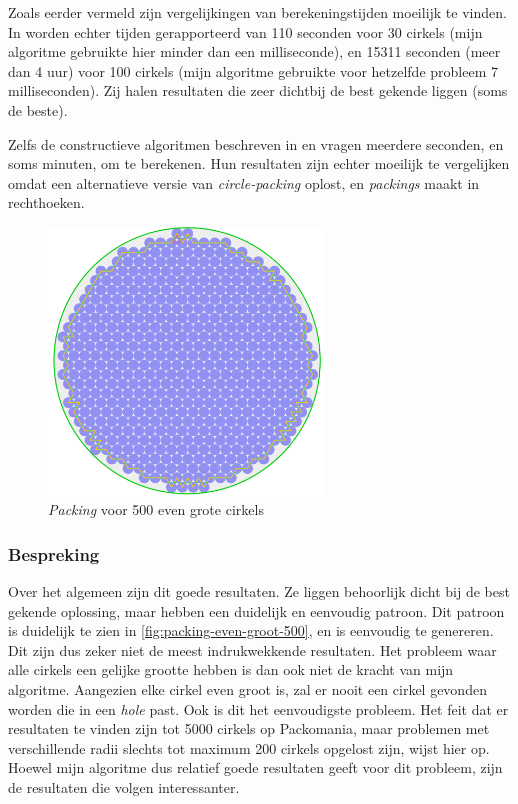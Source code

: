 \documentclass[12pt,a4paper,oneside]{book}
\begin{document}
Zoals eerder vermeld zijn vergelijkingen van berekeningstijden moeilijk te vinden.
In \cite{grosso2010} worden echter tijden gerapporteerd van 110 seconden voor 30 cirkels (mijn algoritme gebruikte hier minder dan een milliseconde), en 15311 seconden (meer dan 4 uur) voor 100 cirkels (mijn algoritme gebruikte voor hetzelfde probleem 7 milliseconden).
Zij halen resultaten die zeer dichtbij de best gekende liggen (soms de beste).

Zelfs de constructieve algoritmen beschreven in \cite{akeb2006basic} en \cite{hifi2004approximate} vragen meerdere seconden, en soms minuten, om te berekenen.
Hun resultaten zijn echter moeilijk te vergelijken omdat \cite{akeb2006basic} een alternatieve versie van \textit{circle-packing} oplost, en \cite{hifi2004approximate} \textit{packings} maakt in rechthoeken.

\begin{figure}
  \centering
  \includegraphics[width=0.65\textwidth]{packing-even-groot-500.png}
  \caption{\textit{Packing} voor 500 even grote cirkels} \label{fig:packing-even-groot-500} 
\end{figure}

\subsubsection{Bespreking}

Over het algemeen zijn dit goede resultaten.
Ze liggen behoorlijk dicht bij de best gekende oplossing, maar hebben een duidelijk en eenvoudig patroon.
Dit patroon is duidelijk te zien in \autoref{fig:packing-even-groot-500}, en is eenvoudig te genereren.
Dit zijn dus zeker niet de meest indrukwekkende resultaten.
Het probleem waar alle cirkels een gelijke grootte hebben is dan ook niet de kracht van mijn algoritme.
Aangezien elke cirkel even groot is, zal er nooit een cirkel gevonden worden die in een \textit{hole} past.
Ook is dit het eenvoudigste probleem.
Het feit dat er resultaten te vinden zijn tot 5000 cirkels op Packomania, maar problemen met verschillende radii slechts tot maximum 200 cirkels opgelost zijn, wijst hier op.
Hoewel mijn algoritme dus relatief goede resultaten geeft voor dit probleem, zijn de resultaten die volgen interessanter.
\end{document}

